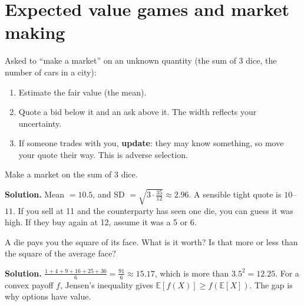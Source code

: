 \documentclass[11pt,a4paper,openany]{report}
\newcommand{\E}{\mathbb{E}}
\begin{document}
\section{Expected value games and market making}
\begin{idea}
Asked to ``make a market'' on an unknown quantity (the sum of 3 dice, the number of cars in a city):
\begin{enumerate}[nosep]
\item Estimate the fair value (the mean).
\item Quote a bid below it and an ask above it. The width reflects your uncertainty.
\item If someone trades with you, \textbf{update}: they may know something, so move your quote their way. This is adverse selection.
\end{enumerate}
\end{idea}
\begin{example}
Make a market on the sum of 3 dice.

\textbf{Solution.} Mean $=10.5$, and SD $=\sqrt{3\cdot\frac{35}{12}}\approx2.96$. A sensible tight quote is $10$--$11$. If you sell at 11 and the counterparty has seen one die, you can guess it was high. If they buy again at 12, assume it was a 5 or 6.
\end{example}

\begin{example}
A die pays you the square of its face. What is it worth? Is that more or less than the square of the average face?

\textbf{Solution.} $\frac{1+4+9+16+25+36}6=\frac{91}6\approx\mathbf{15.17}$, which is more than $3.5^2=12.25$. For a convex payoff $f$, Jensen's inequality gives $\E[f(X)]\ge f(\E[X])$. The gap is why options have value.
\end{example}
\end{document}

